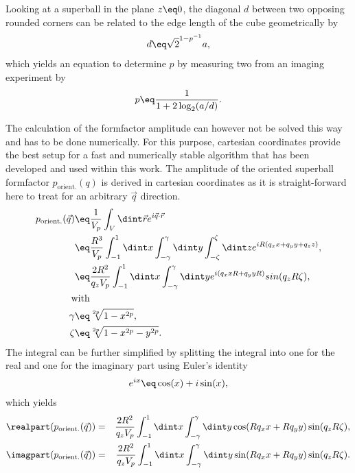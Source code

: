 \documentclass[\main/dresen_thesis.tex]{subfiles}
\begin{document}
    Looking at a superball in the plane $z \eq 0$, the diagonal $d$ between two opposing rounded corners can be related to the edge length of the cube geometrically by
    \begin{align}
      d \eq \sqrt{2}^{1-p^{-1}}a,
    \end{align}
    which yields an equation to determine $p$ by measuring two from an imaging experiment by
    \begin{align}
      p \eq \frac{1}{1 + 2\log_2(a/d)}.
    \end{align}

    The calculation of the formfactor amplitude can however not be solved this way and has to be done numerically.
    For this purpose, cartesian coordinates provide the best setup for a fast and numerically stable algorithm that has been developed and used within this work.
    The amplitude of the oriented superball formfactor $p_\mathrm{orient.}(q)$ is derived in cartesian coordinates as it is straight-forward here to treat for an arbitrary $\vec{q}$ direction.
    \begin{align}
      p_\mathrm{orient.}(\vec{q}) \eq& \frac{1}{V_p} \int_{V} \dint \vec{r} e^{i \vec{q} \cdot \vec{r}}\\
      \eq& \frac{R^3}{V_p} \int_{-1}^{1} \dint x \int_{-\gamma}^{\gamma} \dint y \int_{-\zeta}^{\zeta} \dint z  e^{iR(q_x x + q_y y + q_z z)},\\
      \eq& \frac{2R^2}{q_z V_p} \int_{-1}^{1} \dint x \int_{-\gamma}^{\gamma} \dint y  e^{i (q_x x R + q_y y R)} sin(q_z R \zeta),\\
      \mathrm{with}\nonumber\\
      \gamma \eq& \sqrt[2p]{1-x^{2p}}, \\
      \zeta \eq& \sqrt[2p]{1-x^{2p} -y^{2p}}.
    \end{align}
    The integral can be further simplified by splitting the integral into one for the real and one for the imaginary part using Euler's identity
    \begin{align}
      e^{ix} \eq \cos(x) + i \sin(x),
    \end{align}
    which yields
    \begin{align}
      \realpart (p_\mathrm{orient.}(\vec{q})) &=& \frac{2R^2}{q_z V_p} \int_{-1}^{1} \dint x \int_{-\gamma}^{\gamma} \dint y \cos(R q_x x + R q_y y)  \sin (q_z R \zeta),\\
      \imagpart (p_\mathrm{orient.}(\vec{q})) &=& \frac{2R^2}{q_z V_p} \int_{-1}^{1} \dint x \int_{-\gamma}^{\gamma} \dint y \sin(R q_x x + R q_y y) \sin (q_z R \zeta).
    \end{align}
\end{document}

